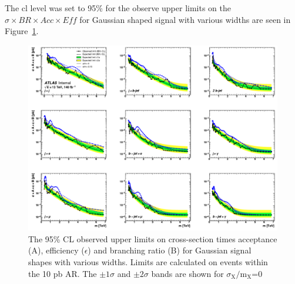 The \gls{cl} level was set to 95\% for the observe upper limits on the $\sigma \times BR \times Acc  \times  Eff$ for Gaussian shaped signal with various widths
are seen in Figure~\ref{fig:freq-limit}.

\newpage

\begin{figure}[H]
    \centering
    \includegraphics[scale=0.7]{figs/ch6/results/merge_gaus.pdf}%
\caption{The 95\% CL observed upper limits on cross-section times acceptance (A), efficiency ($\epsilon$) and branching ratio (B) for Gaussian signal shapes with various widths.
         Limits are calculated on events within the 10 pb AR. The $\pm \textrm{1}\sigma$ and $\pm \textrm{2}\sigma$ bands are shown for $\sigma_{\textrm{X}}/\textrm{m}_{\textrm{X}}$=0}
\label{fig:freq-limit}
\end{figure}
